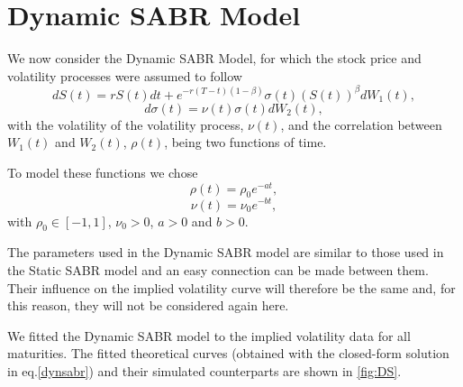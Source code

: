 










\newpage

\section{Dynamic SABR Model}

We now consider the Dynamic SABR Model, for which the stock price and volatility processes were assumed to follow
\begin{equation}
dS(t)=rS(t)dt+e^{-r(T-t)(1-\beta)}\sigma(t) (S(t))^\beta dW_1(t),
\end{equation}
\begin{equation}
d\sigma(t)=\nu(t)\sigma(t) dW_2(t),
\end{equation}
\noindent with the volatility of the volatility process, $\nu(t)$, and the correlation between $W_1(t)$ and $W_2(t)$, $\rho(t)$, being two functions of time.

To model these functions we chose
\begin{equation}
\rho(t)=\rho_0e^{-at},
\end{equation}
\begin{equation}
\nu(t)=\nu_0e^{-bt},
\end{equation}
\noindent with $\rho_0\in[-1,1]$, $\nu_0>0$, $a>0$ and $b>0$.


The parameters used in the Dynamic SABR model are similar to those used in the Static SABR model and an easy connection can be made between them. Their influence on the implied volatility curve will therefore be the same and, for this reason, they will not be considered again here.

We fitted the Dynamic SABR model to the implied volatility data for all maturities. The fitted theoretical curves (obtained with the closed-form solution in eq.\eqref{dynsabr}) and their simulated counterparts are shown in \autoref{fig:DS}.




